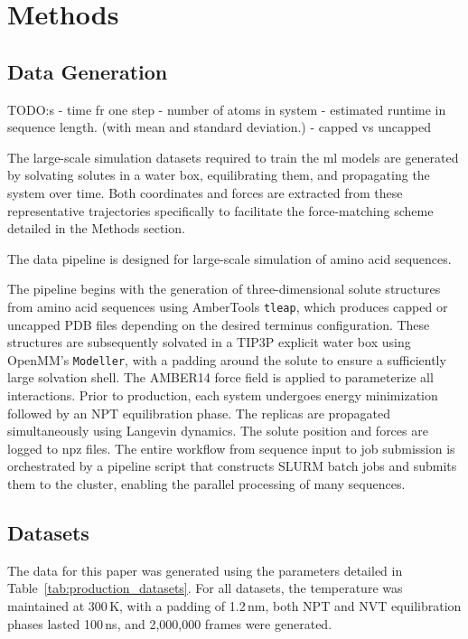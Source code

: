 
\section{Methods}

\subsection{Data Generation}
\label{subsec:data_generation}

TODO:s
- time fr one step
- number of atoms in system
- estimated  runtime in sequence length. (with mean and standard deviation.)
- capped vs uncapped

The large-scale simulation datasets required to train the \gls{ml} models are generated by solvating solutes in a water box, equilibrating them, and propagating the system over time. Both coordinates and forces are extracted from these representative trajectories specifically to facilitate the force-matching scheme detailed in the Methods section.


The data pipeline is designed for large-scale simulation of amino acid sequences. 

The pipeline begins with the generation of three-dimensional solute structures from amino acid sequences using AmberTools \texttt{tleap}, which produces capped or uncapped PDB files depending on the desired terminus configuration. 
These structures are subsequently solvated in a TIP3P explicit water box using OpenMM's \texttt{Modeller}, with a padding around the solute to ensure a sufficiently large solvation shell. The AMBER14 force field is applied to parameterize all interactions. Prior to production, each system undergoes energy minimization followed by an NPT equilibration phase. The replicas are propagated simultaneously using Langevin dynamics. The solute position and forces are logged to npz files. The entire workflow from sequence input to job submission is orchestrated by a pipeline script that constructs SLURM batch jobs and submits them to the cluster, enabling the parallel processing of many sequences.





\subsection{Datasets}
\label{subsec:production_datasets}

The data for this paper was generated using the parameters detailed in Table~\ref{tab:production_datasets}. For all datasets, the temperature was maintained at 300\,K, with a padding of 1.2\,nm, both NPT and NVT equilibration phases lasted 100\,ns, and 2,000,000 frames were generated.

